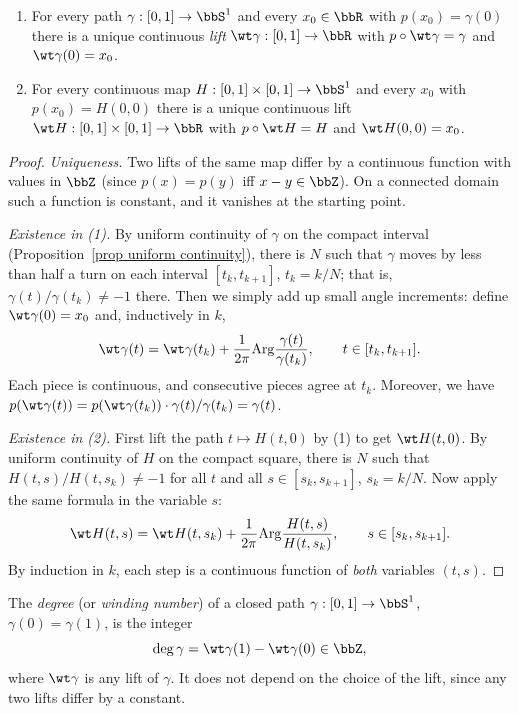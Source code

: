 \begin{lem}\label{lem lifting to R}
\begin{enumerate}
    \item For every path $\gamma:[0,1]\to\bbS^1$ and every $x_0\in\bbR$ with $p(x_0)=\gamma(0)$ there is a unique continuous \emph{lift} $\wt\gamma:[0,1]\to \bbR$ with $p\circ\wt\gamma=\gamma$ and $\wt\gamma(0)=x_0$.
    \item For every continuous map $H:[0,1]\times[0,1]\to\bbS^1$ and every $x_0$ with $p(x_0)=H(0,0)$ there is a unique continuous lift $\wt H:[0,1]\times[0,1]\to\bbR$ with $p\circ\wt H=H$ and $\wt H(0,0)=x_0$.
\end{enumerate}
\end{lem}
\begin{proof}
    \emph{Uniqueness.} Two lifts of the same map differ by a continuous function with values in $\bbZ$ (since $p(x)=p(y)$ iff $x-y\in\bbZ$). On a connected domain such a function is constant, and it vanishes at the starting point.

    \emph{Existence in (1).} By uniform continuity of $\gamma$ on the compact interval (Proposition~\ref{prop uniform continuity}), there is $N$ such that $\gamma$ moves by less than half a turn on each interval $[t_k,t_{k+1}]$, $t_k=k/N$; that is, $\gamma(t)/\gamma(t_k)\neq -1$ there. Then we simply add up small angle increments: define $\wt\gamma(0)=x_0$ and, inductively in $k$,
    \[\wt\gamma(t)=\wt\gamma(t_k)+\frac{1}{2\pi}\mathrm{Arg}\frac{\gamma(t)}{\gamma(t_k)},\qquad t\in[t_k,t_{k+1}].\]
    Each piece is continuous, and consecutive pieces agree at $t_k$. Moreover, we have $p(\wt\gamma(t))=p(\wt\gamma(t_k))\cdot\gamma(t)/\gamma(t_k)=\gamma(t)$.

    \emph{Existence in (2).} First lift the path $t\mapsto H(t,0)$ by (1) to get $\wt H(t,0)$. By uniform continuity of $H$ on the compact square, there is $N$ such that $H(t,s)/H(t,s_k)\neq -1$ for all $t$ and all $s\in[s_k,s_{k+1}]$, $s_k=k/N$. Now apply the same formula in the variable $s$:
    \[\wt H(t,s)=\wt H(t,s_k)+\frac{1}{2\pi}\mathrm{Arg}\frac{H(t,s)}{H(t,s_k)},\qquad s\in[s_k,s_{k+1}].\]
    By induction in $k$, each step is a continuous function of \emph{both} variables $(t,s)$.
\end{proof}

\begin{defn}
    The \emph{degree} (or \emph{winding number}) of a closed path $\gamma:[0,1]\to\bbS^1$, $\gamma(0)=\gamma(1)$, is the integer
    \[\deg\gamma=\wt\gamma(1)-\wt\gamma(0)\in\bbZ,\]
    where $\wt\gamma$ is any lift of $\gamma$. It does not depend on the choice of the lift, since any two lifts differ by a constant.
\end{defn}

